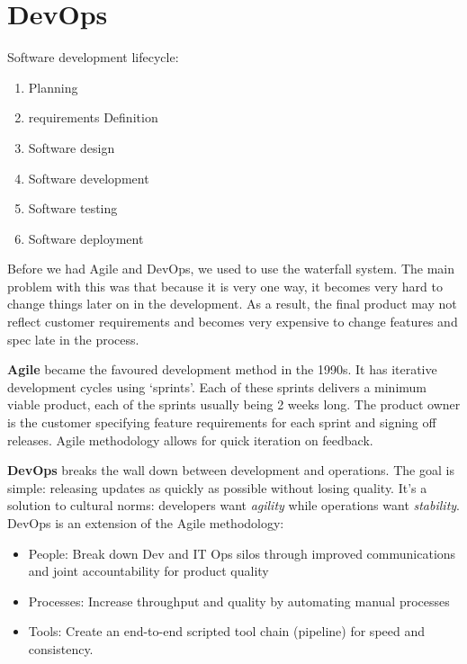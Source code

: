 \documentclass[11pt,a4paper,titlepage,dvipsnames,cmyk]{scrartcl}
\begin{document}
\section{DevOps}
Software development lifecycle:
\begin{enumerate}
\item Planning
\item requirements Definition
\item Software design
\item Software development
\item Software testing
\item Software deployment
\end{enumerate}

Before we had Agile and DevOps, we used to use the waterfall system. The main problem with this was that because it is very one way, it becomes very hard to change things later on in the development. As a result, the final product may not reflect customer requirements and becomes very expensive to change features and spec late in the process.

\textbf{Agile} became the favoured development method in the 1990s. It has iterative development cycles using `sprints'. Each of these sprints delivers a minimum viable product, each of the sprints usually being 2 weeks long. The product owner is the customer specifying feature requirements for each sprint and signing off releases. Agile methodology allows for quick iteration on feedback.

\textbf{DevOps} breaks the wall down between development and operations. The goal is simple: releasing updates as quickly as possible without losing quality. It's a solution to cultural norms: developers want \textit{agility} while operations want \textit{stability}. DevOps is an extension of the Agile methodology:
\begin{itemize}
    \item People: Break down Dev and IT Ops silos through improved communications and joint accountability for product quality
    \item Processes: Increase throughput and quality by automating manual processes
    \item Tools: Create an end-to-end scripted tool chain (pipeline) for speed and consistency.
\end{itemize}
\end{document}
